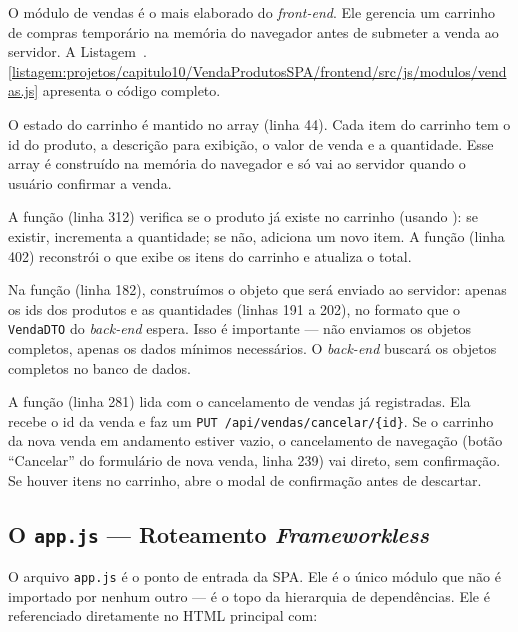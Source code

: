 O módulo de vendas é o mais elaborado do \textit{front-end}. Ele gerencia um carrinho de compras temporário na memória do navegador antes de submeter a venda ao servidor. A Listagem~\thechapter.\ref{listagem:projetos/capitulo10/VendaProdutosSPA/frontend/src/js/modulos/vendas.js} apresenta o código completo.


O estado do carrinho é mantido no array  (linha 44). Cada item do carrinho tem o id do produto, a descrição para exibição, o valor de venda e a quantidade. Esse array é construído na memória do navegador e só vai ao servidor quando o usuário confirmar a venda.

A função  (linha 312) verifica se o produto já existe no carrinho (usando ): se existir, incrementa a quantidade; se não, adiciona um novo item. A função  (linha 402) reconstrói o  que exibe os itens do carrinho e atualiza o total.

Na função  (linha 182), construímos o objeto que será enviado ao servidor: apenas os ids dos produtos e as quantidades (linhas 191 a 202), no formato que o \texttt{VendaDTO} do \textit{back-end} espera. Isso é importante --- não enviamos os objetos completos, apenas os dados mínimos necessários. O \textit{back-end} buscará os objetos completos no banco de dados.

A função  (linha 281) lida com o cancelamento de vendas já registradas. Ela recebe o id da venda e faz um \texttt{PUT /api/vendas/cancelar/\{id\}}. Se o carrinho da nova venda em andamento estiver vazio, o cancelamento de navegação (botão ``Cancelar'' do formulário de nova venda, linha 239) vai direto, sem confirmação. Se houver itens no carrinho, abre o modal de confirmação antes de descartar.


\subsection{O \texttt{app.js} --- Roteamento \textit{Frameworkless}}

O arquivo \texttt{app.js} é o ponto de entrada da SPA. Ele é o único módulo que não é importado por nenhum outro --- é o topo da hierarquia de dependências. Ele é referenciado diretamente no HTML principal com:

